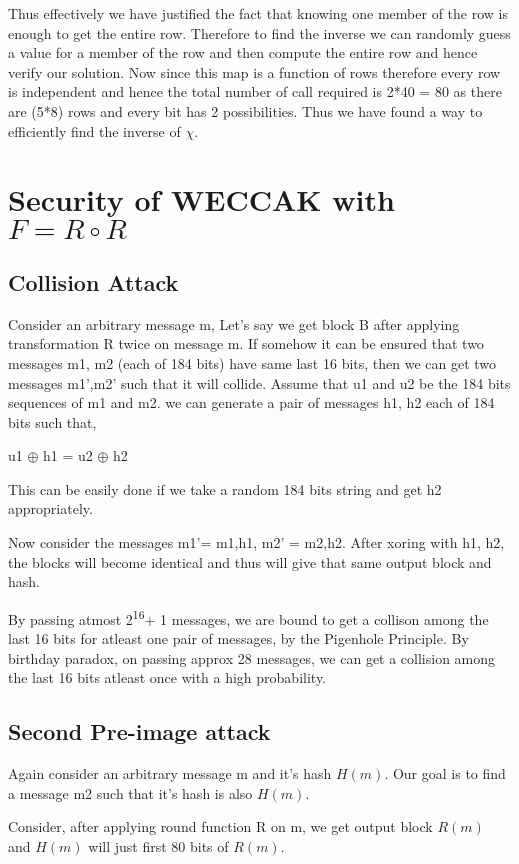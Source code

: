 \documentclass[12 pt,a4paper]{article}
\begin{document}
Thus effectively we have justified the fact that knowing one member of the row is enough to get the entire row. Therefore to find the inverse we can randomly guess a value for a member of the row and then compute the entire row and hence verify our solution. Now since this map is a function of rows therefore every row is independent and hence the total number of call required is 2*40 = 80 as there are (5*8) rows and every bit has 2 possibilities. Thus we have found a way to efficiently find the inverse of $\chi$.

\section{Security of WECCAK with $F = R \circ R$}
\subsection{Collision Attack}
Consider an arbitrary message m, Let's say we get block B after applying transformation R twice on message m. If somehow it can be ensured that two messages m1, m2 (each of 184 bits) have same last 16 bits, then we can get two messages m1',m2' such that it will collide. 
Assume that u1 and u2 be the 184 bits sequences of m1 and m2. we can generate a pair of messages h1, h2 each of 184 bits such that,

\centerline{u1 $\oplus$ h1 = u2 $\oplus$ h2}

This can be easily done if we take a random 184 bits string and get h2 appropriately.

Now consider the messages m1'= m1,h1, m2' = m2,h2.
 After xoring with h1, h2, the blocks will
become identical and thus will give that same output block and hash.

By passing atmost 2\textsuperscript{16}+ 1 messages, we are bound to get a collison among the last 16 bits for
atleast one pair of messages, by the Pigenhole Principle. By birthday paradox, on passing approx 28
messages, we can get a collision among the last 16 bits atleast once with a high probability.

\subsection{Second Pre-image attack}
Again consider an arbitrary message m and it's hash $H(m)$.
Our goal is to find a message m2 such that it's hash is also $H(m)$.

Consider, after applying round function R on m, we get output block $R(m)$ and $H(m)$ will just first 80 bits of $R(m)$.
\end{document}
